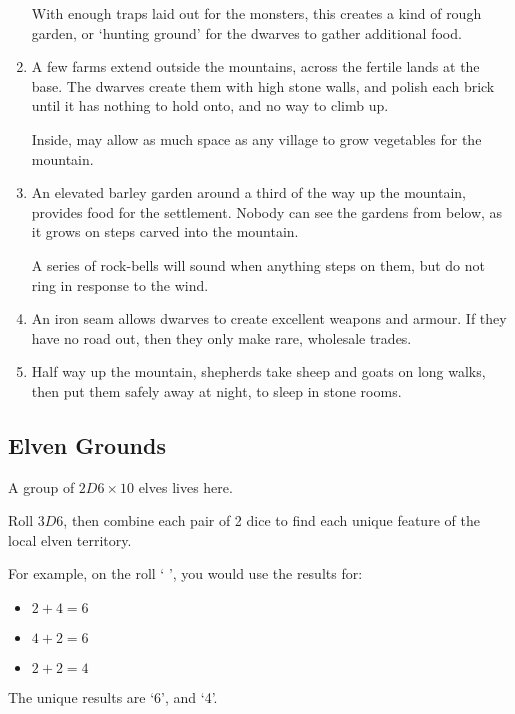 \begin{multicols}{2}
\begin{enumerate}
  With enough traps laid out for the monsters, this creates a kind of rough garden, or `hunting ground' for the dwarves to gather additional food.
  \item
  A few farms extend outside the mountains, across the fertile lands at the base.
  The dwarves create them with high stone walls, and polish each brick until it has nothing to hold onto, and no way to climb up.

  Inside, may allow as much space as any \gls{village} to grow vegetables for the mountain.
  \item
  An elevated barley garden around a third of the way up the mountain, provides food for the settlement.
  Nobody can see the gardens from below, as it grows on steps carved into the mountain.

  A series of rock-bells will sound when anything steps on them, but do not ring in response to the wind.
  \item
  An iron seam allows dwarves to create excellent weapons and armour.
  If they have no road out, then they only make rare, wholesale trades.
  \item
  Half way up the mountain, shepherds take sheep and goats on long walks, then put them safely away at night, to sleep in stone rooms.
\end{enumerate}

\subsection{Elven Grounds}

A group of $2D6 \times 10$ elves lives here.

Roll $3D6$, then combine each pair of 2 dice to find each unique feature of the local elven territory.

\begin{exampletext}
  For example, on the roll `  ', you would use the results for:

  \begin{itemize}
    \item
    $2+4 = 6$
    \item
    $4+2 = 6$
    \item
    $2+2 = 4$
  \end{itemize}

  The unique results are `6', and `4'.
\end{exampletext}


\end{multicols}
